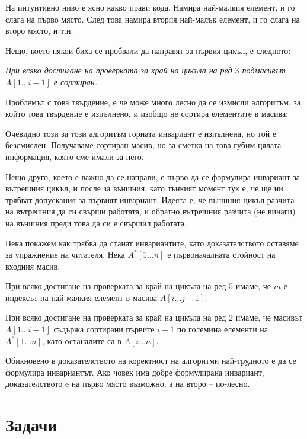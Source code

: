 На интуитивно ниво е ясно какво прави кода.
Намира най-малкия елемент, и го слага на първо място.
След това намира втория най-малък елемент, и го слага на второ място, и т.н.

Нещо, което някои биха се пробвали да направят за първия цикъл, е следното:
\begin{center}
    \textit{При всяко достигане на проверката за край на цикъла на ред $3$ подмасивът $A[1 \dots i - 1]$ е сортиран.}
\end{center}

Проблемът с това твърдение, е че може много лесно да се измисли алгоритъм, за който това твърдение е изпълнено, и изобщо не сортира елементите в масива:


Очевидно този за този алгоритъм горната инвариант е изпълнена, но той е безсмислен.
Получаваме сортиран масив, но за сметка на това губим цялата информация, която сме имали за него.

Нещо друго, което е важно да се направи, е първо да се формулира инвариант за вътрешния цикъл, и после за външния, като тънкият момент тук е, че ще ни трябват допускания за първият инвариант.
Идеята е, че външния цикъл разчита на вътрешния да си свърши работата, и обратно вътрешния разчита (не винаги) на външния преди това да си е свършил работата.

Нека покажем как трябва да станат инвариантите, като доказателството оставяме за упражнение на читателя.
Нека $A^*[1 \dots n]$ е първоначалната стойност на входния масив.
\begin{invariant}
    При всяко достигане на проверката за край на цикъла на ред $5$ имаме, че $m$ е индексът на най-малкия елемент в масива $A[i \dots j - 1]$.
\end{invariant}

\begin{invariant}
    При всяко достигане на проверката за край на цикъла на ред $2$ имаме, че масивът $A[1 \dots i - 1]$ съдържа сортирани първите $i - 1$ по големина елементи на $A^*[1 \dots n]$, като останалите са в $A[i \dots n]$.
\end{invariant}

Обикновено в доказателството на коректност на алгоритми най-трудното е да се формулира инвариантът.
Ако човек има добре формулирана инвариант, доказателството e на първо място възможно, а на второ -- по-лесно.

\section{Задачи}

